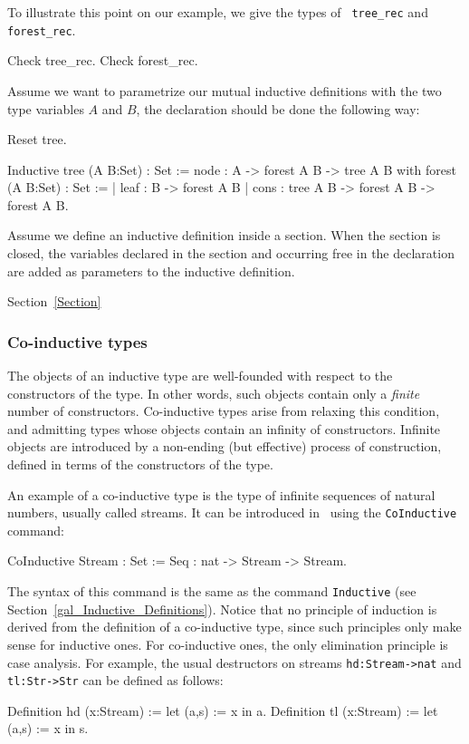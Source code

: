To illustrate this point on our example, we give the types of {\tt
  tree\_rec} and {\tt forest\_rec}.

\begin{coq_example}
Check tree_rec.
Check forest_rec.
\end{coq_example}

Assume we want to parametrize our mutual inductive definitions with
the two type variables $A$ and $B$, the declaration should be done the
following way:

\begin{coq_eval}
Reset tree.
\end{coq_eval}
\begin{coq_example*}
Inductive tree (A B:Set) : Set :=
    node : A -> forest A B -> tree A B
with forest (A B:Set) : Set :=
  | leaf : B -> forest A B
  | cons : tree A B -> forest A B -> forest A B.
\end{coq_example*}

Assume we define an inductive definition inside a section.  When the
section is closed, the variables declared in the section and occurring
free in the declaration are added as parameters to the inductive
definition. 

\SeeAlso Section~\ref{Section}

\subsubsection{Co-inductive types
\label{CoInductiveTypes}
}

The objects of an inductive type are well-founded with respect to the
constructors of the type. In other words, such objects contain only a
{\it finite} number of constructors. Co-inductive types arise from
relaxing this condition, and admitting types whose objects contain an
infinity of constructors. Infinite objects are introduced by a
non-ending (but effective) process of construction, defined in terms
of the constructors of the type.

An example of a co-inductive type is the type of infinite sequences of
natural numbers, usually called streams. It can be introduced in \Coq\
using the \texttt{CoInductive} command:
\begin{coq_example}
CoInductive Stream : Set :=
    Seq : nat -> Stream -> Stream.
\end{coq_example}

The syntax of this command is the same as the command \texttt{Inductive}
(see Section~\ref{gal_Inductive_Definitions}). Notice that no
principle of induction is derived from the definition of a
co-inductive type, since such principles only make sense for inductive
ones. For co-inductive ones, the only elimination principle is case
analysis. For example, the usual destructors on streams
\texttt{hd:Stream->nat} and \texttt{tl:Str->Str} can be defined as
follows:
\begin{coq_example}
Definition hd (x:Stream) := let (a,s) := x in a.
Definition tl (x:Stream) := let (a,s) := x in s.
\end{coq_example}

